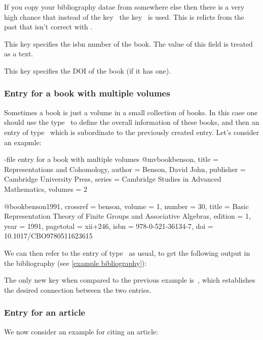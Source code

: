 \begin{refsection}
\begin{description}
    If you copy your bibliography datae from somewhere else then there is a very high chance that instead of the key~ the key~ is used.
    This is relicts from the past that isn’t correct with .
  \item[\inlinecode{isbn}]
    This key specifies the isbn number of the book.
    The value of this field is treated as a text.
  \item[\inlinecode{doi}]
    This key specifies the DOI of the book (if it has one).
\end{description}

\subsubsection{Entry for a book with multiple volumes}

Sometimes a book is just a volume in a small collection of books.
In this case one should use the type~ to define the overall information of these books, and then an entry of type~ which is subordinate to the previously created entry.
Let’s consider an exapmle:
\begin{showcode}{-file entry for a book with multiple volumes}
@mvbook{benson,
  title     = {Representations and Cohomology},
  author    = {Benson, David John},
  publisher = {Cambridge University Press},
  series    = {Cambridge Studies in Advanced Mathematics},
  volumes   = {2}
}

@book{benson1991,
  crossref  = {benson},
  volume    = {1},
  number    = {30},
  title     = {Basic Representation Theory of Finite Groups and Associative Algebras},
  edition   = {1},
  year      = {1991},
  pagetotal = {xii+246},
  isbn      = {978-0-521-36134-7},
  doi       = {10.1017/CBO9780511623615}
}
\end{showcode}
We can then refer to the entry of type~ as usual, to get the following output in the bibliography (see \cref{example bibliography}):

The only new key when compared to the previous example is~, which establishes the desired connection between the two entries.

\subsubsection{Entry for an article}

We now consider an example for citing an article:


\end{refsection}
